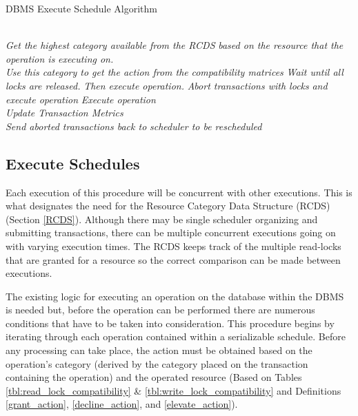 \documentclass[conference]{IEEEtran}
\begin{document}
\begin{algorithm}
\caption{DBMS Execute Schedule Algorithm}
\label{alg:exec_sched}
\begin{algorithmic}[1]

    \\
        \State \textit{Get the highest category available from the RCDS}
        \State \textit{based on the resource that the operation is}
        \State \textit{executing on.}
        \\
        \State \textit{Use this category to get the action from the}
        \State \textit{compatibility matrices}
            \State \textit{Wait until all locks are released.}
            \State \textit{Then execute operation.}
            \State \textit{Abort transactions with locks}
            \State \textit{and execute operation}
            \State \textit{Execute operation}
        \EndIf
    \EndFor
    \\
    \State \textit{Update Transaction Metrics}
    \\
    \State \textit{Send aborted transactions back to}
    \State \textit{scheduler to be rescheduled}
\EndProcedure

\end{algorithmic}
\end{algorithm}

\subsection{Execute Schedules}
Each execution of this procedure will be concurrent with other executions. This is what designates the need for the Resource Category Data Structure (RCDS) (Section \ref{RCDS}). Although there may be single scheduler organizing and submitting transactions, there can be multiple concurrent executions going on with varying execution times. The RCDS keeps track of the multiple read-locks that are granted for a resource so the correct comparison can be made between executions.

The existing logic for executing an operation on the database within the DBMS is needed but, before the operation can be performed there are numerous conditions that have to be taken into consideration. This procedure begins by iterating through each operation contained within a serializable schedule. Before any processing can take place, the action must be obtained based on the operation's category (derived by the category placed on the transaction containing the operation) and the operated resource (Based on Tables \ref{tbl:read_lock_compatibility} \& \ref{tbl:write_lock_compatibility} and Definitions \ref{grant_action}, \ref{decline_action}, and \ref{elevate_action}).
\end{document}
